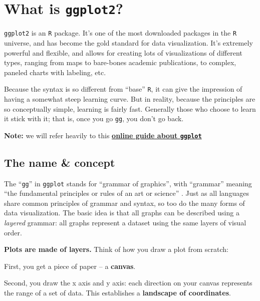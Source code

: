 \documentclass[
]{book}
\begin{document}
\hypertarget{what-is-ggplot2}{%
\section*{\texorpdfstring{What is \texttt{ggplot2}?}{What is ggplot2?}}\label{what-is-ggplot2}}

\texttt{ggplot2} is an \texttt{R} package. It's one of the most downloaded packages in the \texttt{R} universe, and has become the gold standard for data visualization. It's extremely powerful and flexible, and allows for creating lots of visualizations of different types, ranging from maps to bare-bones academic publications, to complex, paneled charts with labeling, etc.

Because the syntax is so different from ``base'' \texttt{R}, it can give the impression of having a somewhat steep learning curve. But in reality, because the principles are so conceptually simple, learning is fairly fast. Generally those who choose to learn it stick with it; that is, once you go \texttt{gg}, you don't go back.

\textbf{Note:} we will refer heavily to this \href{https://ggplot2-book.org/introduction.html}{\textbf{online guide about \texttt{ggplot}}}

\hypertarget{the-name-concept}{%
\subsection*{The name \& concept}\label{the-name-concept}}

The ``\texttt{gg}'' in \texttt{ggplot} stands for ``grammar of graphics'', with ``grammar'' meaning ``the fundamental principles or rules of an art or science'' \citep{layered-grammar}. Just as all languages share common principles of grammar and syntax, so too do the many forms of data visualization. The basic idea is that all graphs can be described using a \emph{layered} grammar: all graphs represent a dataset using the same layers of visual order.

\textbf{Plots are made of layers.} Think of how you draw a plot from scratch:

First, you get a piece of paper -- a \textbf{canvas}.

Second, you draw the x axis and y axis: each direction on your canvas represents the range of a set of data. This establishes a \textbf{landscape of coordinates}.
\end{document}
